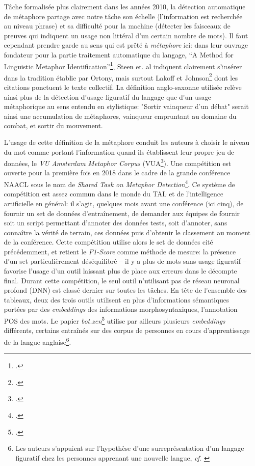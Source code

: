 Tâche formalisée plus clairement dans les années 2010, la détection automatique de métaphore partage avec notre tâche son échelle (l'information est recherchée au niveau phrase) et sa difficulté pour la machine (détecter les faisceaux de preuves qui indiquent un usage non littéral d'un certain nombre de mots). Il faut cependant prendre garde au sens qui est prêté à \textit{métaphore} ici: dans leur ouvrage fondateur pour la partie traitement automatique du langage, \enquote{A Method for Linguistic Metaphor Identification}\footcite{steen_method_2010}, Steen et. al indiquent clairement s'insérer dans la tradition établie par Ortony, mais surtout Lakoff et Johnson\footcite{lakoff_metaphors_2003} dont les citations ponctuent le texte collectif. La définition anglo-saxonne utilisée relève ainsi plus de la détection d'usage figuratif du langage que d'un usage métaphorique au sens entendu en stylistique: "Sortir vainqueur d'un débat" serait ainsi une accumulation de métaphores, vainqueur empruntant au domaine du combat, et sortir du mouvement.

L'usage de cette définition de la métaphore conduit les auteurs à choisir le niveau du mot comme portant l'information quand ils établissent leur propre jeu de données, le \textit{VU Amsterdam Metaphor Corpus} (VUA\footcite{steen_method_2010}). Une compétition est ouverte pour la première fois en 2018 dans le cadre de la grande conférence NAACL sous le nom de \textit{Shared Task on Metaphor Detection}\footcite{leong_report_2018}. Ce système de compétition est assez commun dans le monde du TAL et de l'intelligence artificielle en général: il s'agit, quelques mois avant une conférence (ici cinq), de fournir un set de données d'entraînement, de demander aux équipes de fournir soit un script permettant d'annoter des données tests, soit d'annoter, sans connaître la vérité de terrain, ces données puis d'obtenir le classement au moment de la conférence. Cette compétition utilise alors le set de données cité précédemment, et retient le \textit{F1-Score} comme méthode de mesure: la présence d'un set particulièrement déséquilibré -- il y a plus de mots sans usage figuratif -- favorise l'usage d'un outil laissant plus de place aux erreurs dans le décompte final. Durant cette compétition, le seul outil n'utilisant pas de réseau neuronal profond (DNN) est classé dernier sur toutes les tâches. En tête de l'ensemble des tableaux, deux des trois outils utilisent en plus d'informations sémantiques portées par des \textit{embeddings} des informations morphosyntaxiques, l'annotation POS des mots. Le papier \textit{bot.zen}\footcite{stemle_using_2018} utilise par ailleurs plusieurs \textit{embeddings} différents, certains entraînés sur des corpus de personnes en cours d'apprentissage de la langue anglaise\footnote{Les auteurs s'appuient sur l'hypothèse d'une surreprésentation d'un langage figuratif chez les personnes apprenant une nouvelle langue, \textit{cf.} \textcite{klebanov_argumentation-relevant_2013}}. 


